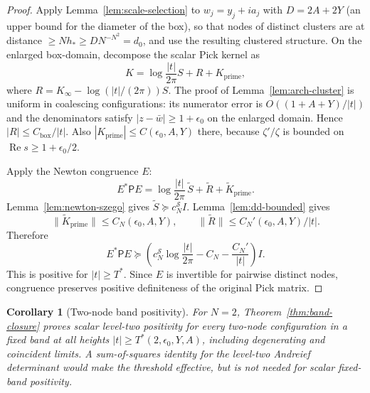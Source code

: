 \documentclass[11pt]{amsart}
\newtheorem{corollary}[theorem]{Corollary}
\theoremstyle{definition}
\theoremstyle{remark}
\theoremstyle{definition}
\renewcommand{\Re}{\operatorname{Re}}
\begin{document}
\begin{proof}
Apply Lemma~\ref{lem:scale-selection} to $w_j=y_j+ia_j$ with $D=2A+2Y$ (an upper bound for the
diameter of the box), so that nodes of distinct clusters are at distance $\ge Nh_*\ge DN^{-N^2}=d_0$, and
use the resulting clustered structure.  On the enlarged box-domain, decompose the scalar Pick kernel as
\[
   K=\log\frac{|t|}{2\pi}S+R+K_{\mathrm{prime}},
\]
where $R=K_\infty-\log(|t|/(2\pi))S$.  The proof of Lemma~\ref{lem:arch-cluster} is uniform in
coalescing configurations: its numerator error is $O((1+A+Y)/|t|)$ and the denominators satisfy
$|z-\bar w|\ge1+\epsilon_0$ on the enlarged domain.  Hence $|R|\le C_{\mathrm{box}}/|t|$.  Also
$|K_{\mathrm{prime}}|\le C(\epsilon_0,A,Y)$ there, because $\zeta'/\zeta$ is bounded on
$\Re s\ge1+\epsilon_0/2$.

Apply the Newton congruence $E$:
\[
   E^*\mathsf P E
   =
   \log\frac{|t|}{2\pi}\,\widetilde S
   +
   \widetilde R
   +
   \widetilde K_{\mathrm{prime}}.
\]
Lemma~\ref{lem:newton-szego} gives $\widetilde S\succeq c_N^{\mathcal S}I$.  Lemma~\ref{lem:dd-bounded}
gives
\[
   \|\widetilde K_{\mathrm{prime}}\|\le C_N(\epsilon_0,A,Y),
   \qquad
   \|\widetilde R\|\le C_N'(\epsilon_0,A,Y)/|t|.
\]
Therefore
\[
   E^*\mathsf P E
   \succeq
   \left(
      c_N^{\mathcal S}\log\frac{|t|}{2\pi}
      -
      C_N
      -
      \frac{C_N'}{|t|}
   \right)I.
\]
This is positive for $|t|\ge T^*$.  Since $E$ is invertible for pairwise distinct nodes, congruence
preserves positive definiteness of the original Pick matrix.
\end{proof}

\begin{corollary}[Two-node band positivity]\label{cor:H7-band}
For $N=2$, Theorem~\ref{thm:band-closure} proves scalar level-two positivity for every two-node
configuration in a fixed band at all heights $|t|\ge T^*(2,\epsilon_0,Y,A)$, including degenerating
and coincident limits.  A sum-of-squares identity for the level-two Andreief determinant would make the
threshold effective, but is not needed for scalar fixed-band positivity.
\end{corollary}
\end{document}
